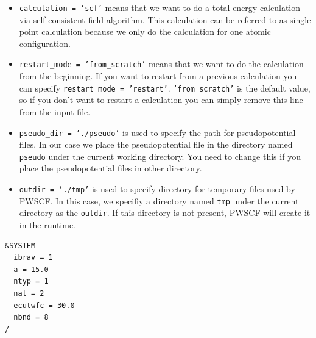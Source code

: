 \documentclass[12pt,english]{paper}
\begin{document}
\begin{itemize}
\item \texttt{calculation = 'scf'} means that we want to do a total energy
calculation via self consistent field algorithm. This calculation
can be referred to as single point calculation because we only do
the calculation for one atomic configuration.
\item \texttt{restart\_mode = 'from\_scratch'} means that we want to do
the calculation from the beginning. If you want to restart from a
previous calculation you can specify \texttt{restart\_mode = 'restart'}.
\texttt{'from\_scratch'} is the default value, so if you don't want
to restart a calculation you can simply remove this line from the
input file.
\item \texttt{pseudo\_dir = './pseudo'} is used to specify the path for
pseudopotential files. In our case we place the pseudopotential file
in the directory named \texttt{pseudo} under the current working directory.
You need to change this if you place the pseudopotential files in
other directory.
\item \texttt{outdir = './tmp'} is used to specify directory for temporary
files used by PWSCF. In this case, we specifiy a directory named \texttt{tmp}
under the current directory as the \texttt{outdir}. If this directory
is not present, PWSCF will create it in the runtime.
\end{itemize}
\begin{lstlisting}
&SYSTEM
  ibrav = 1
  a = 15.0
  ntyp = 1
  nat = 2
  ecutwfc = 30.0
  nbnd = 8
/
\end{lstlisting}
\end{document}
